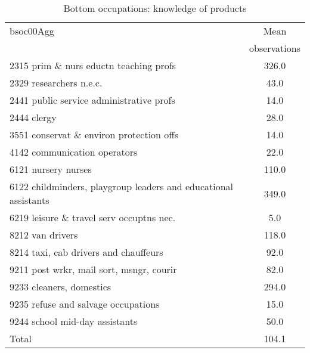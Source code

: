 \begin{table}
	\centering
	\caption{Bottom occupations: knowledge of products}
	\begin{tabular}{lc}
	\toprule	
		
bsoc00Agg&Mean \\
&observations \\
\hline
2315 prim \& nurs eductn teaching profs&326.0 \\
2329 researchers n.e.c.&43.0 \\
2441 public service administrative profs&14.0 \\
2444 clergy&28.0 \\
3551 conservat \& environ protection offs&14.0 \\
4142 communication operators&22.0 \\
6121 nursery nurses&110.0 \\
6122 childminders, playgroup leaders and educational assistants&349.0 \\
6219 leisure \& travel serv occuptns nec.&5.0 \\
8212 van drivers&118.0 \\
8214 taxi, cab drivers and chauffeurs&92.0 \\
9211 post wrkr, mail sort, msngr, courir&82.0 \\
9233 cleaners, domestics&294.0 \\
9235 refuse and salvage occupations&15.0 \\
9244 school mid-day assistants&50.0 \\
Total&104.1 \\
\bottomrule
\bottomrule
\end{tabular}
\end{table}
